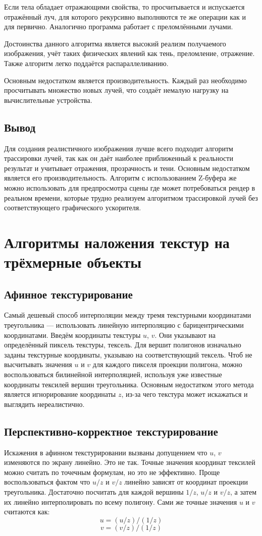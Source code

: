 \documentclass[12pt,a4paper,oneside]{report}
\begin{document}
				Если тела обладает отражающими свойства, то просчитывается и испускается отражённый луч, для которого рекурсивно выполняются те же операции как и для первично. Аналогично программа работает с преломлёнными лучами.
				
				Достоинства данного алгоритма является высокий реализм получаемого изображения, учёт таких физических явлений как тень, преломление, отражение. Также алгоритм легко поддаётся распараллеливанию.
				
				Основным недостатком является производительность. Каждый раз необходимо просчитывать множество новых лучей, что создаёт немалую нагрузку на вычислительные устройства.
			\subsection{Вывод}
				\quad Для создания реалистичного изображения лучше всего подходит алгоритм трассировки лучей, так как он даёт наиболее приближенный к реальности результат и учитывает отражения, прозрачность и тени. Основным недостатком является его производительность. Алгоритм с использованием Z-буфера же можно использовать для предпросмотра сцены где может потребоваться рендер в реальном времени, которые трудно реализуем алгоритмом трассировкой лучей без соответствующего графического ускорителя.
		\section{Алгоритмы наложения текстур на трёхмерные объекты}
			\subsection{Афинное текстурирование}
				\quad Самый дешевый способ интерполяции между тремя текстурными координатами треугольника — использовать линейную интерполяцию с барицентрическими координатами. Введём координаты текстуры $u$, $v$. Они указывают на определённый пиксель текстуры, тексель. Для вершит полигонов изначально заданы текстурные координаты, указываю на соответствующий тексель. Чтоб не высчитывать значения $u$ и $v$ для каждого пикселя проекции полигона, можно воспользоваться билинейной интерполяцией, используя уже известные координаты тексилей вершин треугольника. Основным недостатком этого метода является игнорирование координаты $z$, из-за чего текстура может искажаться и выглядить нереалистично.
			\subsection{Перспективно-корректное текстурирование}
				\quad Искажения в афинном текстурировании вызваны допущением что $u$, $v$ изменяются по экрану линейно. Это не так. Точные значения координат тексилей можно считать по точечным формулам, но это не эффективно. Проще воспользоваться фактом что $u/z$ и $v/z$ линейно зависят от координат проекции треугольника. Достаточно посчитать для каждой вершины $1/z$, $u/z$ и $v/z$, а затем их линейно интерполировать по всему полигону. Сами же точные значения $u$ и $v$ считаются как: \[ u=(u/z)/(1/z) \] \[ v=(v/z)/(1/z) \]
\end{document}
